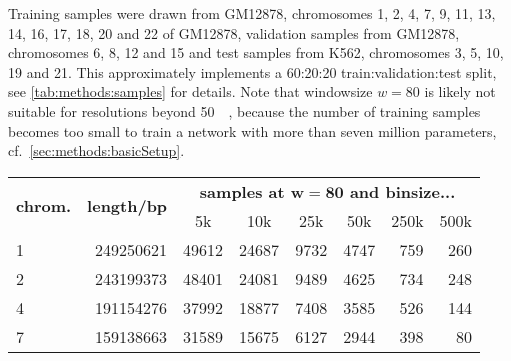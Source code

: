 Training samples were drawn from GM12878, chromosomes 1, 2, 4, 7, 9, 11, 13, 14, 16, 17, 18, 20 and 22 of GM12878, 
validation samples from GM12878, chromosomes 6, 8, 12 and 15 and test samples from K562, chromosomes 3, 5, 10, 19 and 21.
This approximately implements a 60:20:20 train:validation:test split, see \cref{tab:methods:samples} for details.
Note that windowsize $w=80$ is likely not suitable for resolutions beyond \SI{50}{\kilo\bp}, because the number of training samples becomes too small
to train a network with more than seven million parameters, cf.~\cref{sec:methods:basicSetup}.
\begin{table}[hbp]
\centering
\begin{tabular}{lrrrrrrr}
\hline
\multicolumn{1}{c}{\multirow{2}{*}{\textbf{chrom.}}} & \multicolumn{1}{c}{\multirow{2}{*}{\textbf{length/bp}}} & \multicolumn{6}{c}{\textbf{samples at $\mathbf{w=80}$ and binsize...}}                                                                                                \\
\multicolumn{1}{c}{}                                     & \multicolumn{1}{c}{}                                    & \multicolumn{1}{c}{5k} & \multicolumn{1}{c}{10k} & \multicolumn{1}{c}{25k} & \multicolumn{1}{c}{50k} & \multicolumn{1}{c}{250k} & \multicolumn{1}{c}{500k} \\ \hline
1                                                        & 249250621                                               & 49612                  & 24687                   & 9732                    & 4747                    & 759                      & 260                      \\
2                                                        & 243199373                                               & 48401                  & 24081                   & 9489                    & 4625                    & 734                      & 248                      \\
4                                                        & 191154276                                               & 37992                  & 18877                   & 7408                    & 3585                    & 526                      & 144                      \\
7                                                        & 159138663                                               & 31589                  & 15675                   & 6127                    & 2944                    & 398                      & 80                       \\

\end{tabular}
\end{table}
